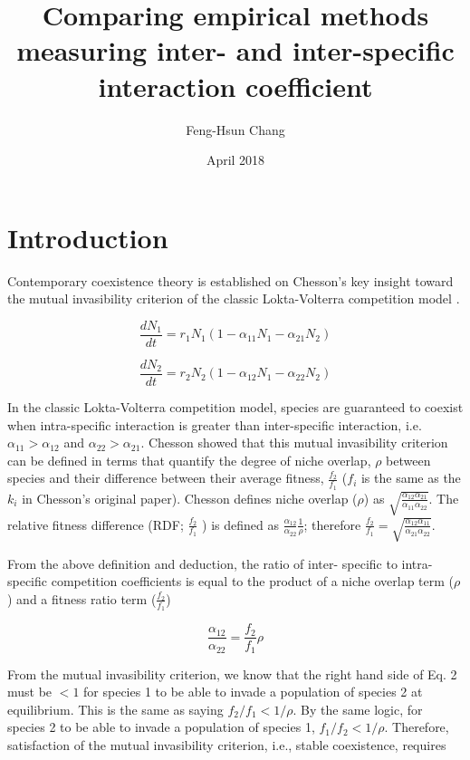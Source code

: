 \documentclass[fleqn]{article}
\title{Comparing empirical methods measuring inter- and inter-specific interaction coefficient}
\author{Feng-Hsun Chang}
\date{April 2018}
\begin{document}
\maketitle

\section*{Introduction}

Contemporary coexistence theory is established on Chesson's key insight toward the mutual invasibility criterion of the classic Lokta-Volterra competition model \cite{Chesson1990, Chesson2000, Chesson2013, Chesson2008, Adler2007}. 


\begin{equation}\label{eq:1}
 \frac{dN_1}{dt} = r_1N_1(1 - \alpha_{11}N_1 - \alpha_{21}N_2)
\end{equation}

\begin{equation}\label{eq:2}
 \frac{dN_2}{dt} = r_2N_2(1 - \alpha_{12}N_1 - \alpha_{22}N_2)
\end{equation}


In the classic Lokta-Volterra competition model, species are guaranteed to coexist when intra-specific interaction is greater than inter-specific interaction, i.e. $\alpha_{11} > \alpha_{12}$ and $\alpha_{22} > \alpha_{21}$. Chesson showed that this mutual invasibility criterion can be defined in terms that quantify the degree of niche overlap, $\rho$ between species and their difference between their average fitness, $\frac{f_2}{f_1}$ ($f_i$ is the same as the $k_i$ in Chesson's original paper). Chesson defines niche overlap ($\rho$) as $\sqrt{\frac{\alpha_{12} \alpha_{21}}{\alpha_{11} \alpha_{22}}}.$ The relative fitness difference (RDF; $\frac{f_2}{f_1}$ ) is defined as $\frac{\alpha_{12}}{\alpha_{22}}\frac{1}{\rho}$; therefore $ \frac{f_2}{f_1} = \sqrt{\frac{\alpha_{12}\alpha_{11}}{\alpha_{21}\alpha_{22}}}.$

From the above definition and deduction, the ratio of inter- specific to intra- specific competition coefficients is equal to the product of a niche overlap term ($\rho$) and a fitness ratio term ($\frac{f_2}{f_1}$)

\begin{equation}\label{eq:3}
 \frac{\alpha_{12}}{\alpha_{22}} = \frac{f_2}{f_1}\rho
\end{equation}

\noindent From the mutual invasibility criterion, we know that the right hand side of Eq. 2 must be $<1$ for species 1 to be able to invade a population of species 2 at equilibrium. This is the same as saying $f_2/f_1 < 1/\rho$. By the same logic, for species 2 to be able to invade a population of species 1, $f_1/f_2 < 1/\rho$. Therefore, satisfaction of the mutual invasibility criterion, i.e., stable coexistence, requires 
\end{document}
